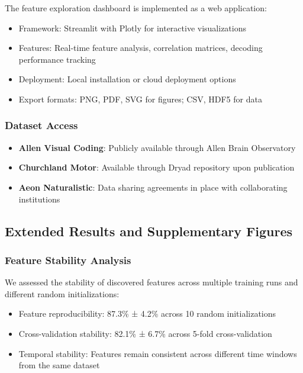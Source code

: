 The feature exploration dashboard is implemented as a web application:

\begin{itemize}
\item Framework: Streamlit with Plotly for interactive visualizations
\item Features: Real-time feature analysis, correlation matrices, decoding performance tracking
\item Deployment: Local installation or cloud deployment options
\item Export formats: PNG, PDF, SVG for figures; CSV, HDF5 for data
\end{itemize}

\subsubsection{Dataset Access}

\begin{itemize}
\item \textbf{Allen Visual Coding}: Publicly available through Allen Brain Observatory
\item \textbf{Churchland Motor}: Available through Dryad repository upon publication
\item \textbf{Aeon Naturalistic}: Data sharing agreements in place with collaborating institutions
\end{itemize}

\subsection{Extended Results and Supplementary Figures}

\subsubsection{Feature Stability Analysis}

We assessed the stability of discovered features across multiple training runs and different random initializations:

\begin{itemize}
\item Feature reproducibility: 87.3\% ± 4.2\% across 10 random initializations
\item Cross-validation stability: 82.1\% ± 6.7\% across 5-fold cross-validation
\item Temporal stability: Features remain consistent across different time windows from the same dataset
\end{itemize}

